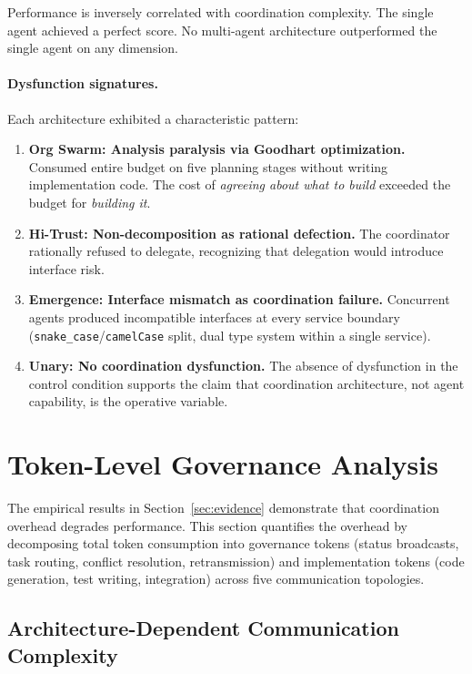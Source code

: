 \documentclass[11pt,a4paper]{article}
\begin{document}
Performance is inversely correlated with coordination complexity. The single agent achieved a perfect score. No multi-agent architecture outperformed the single agent on any dimension.

\paragraph{Dysfunction signatures.} Each architecture exhibited a characteristic pattern:

\begin{enumerate}
\item \textbf{Org Swarm: Analysis paralysis via Goodhart optimization.} Consumed entire budget on five planning stages without writing implementation code. The cost of \emph{agreeing about what to build} exceeded the budget for \emph{building it}.

\item \textbf{Hi-Trust: Non-decomposition as rational defection.} The coordinator rationally refused to delegate, recognizing that delegation would introduce interface risk.

\item \textbf{Emergence: Interface mismatch as coordination failure.} Concurrent agents produced incompatible interfaces at every service boundary (\texttt{snake\_case}/\texttt{camelCase} split, dual type system within a single service).

\item \textbf{Unary: No coordination dysfunction.} The absence of dysfunction in the control condition supports the claim that coordination architecture, not agent capability, is the operative variable.
\end{enumerate}


\section{Token-Level Governance Analysis}
\label{sec:token-analysis}

The empirical results in Section~\ref{sec:evidence} demonstrate that coordination overhead degrades performance. This section quantifies the overhead by decomposing total token consumption into governance tokens (status broadcasts, task routing, conflict resolution, retransmission) and implementation tokens (code generation, test writing, integration) across five communication topologies.

\subsection{Architecture-Dependent Communication Complexity}
\end{document}
